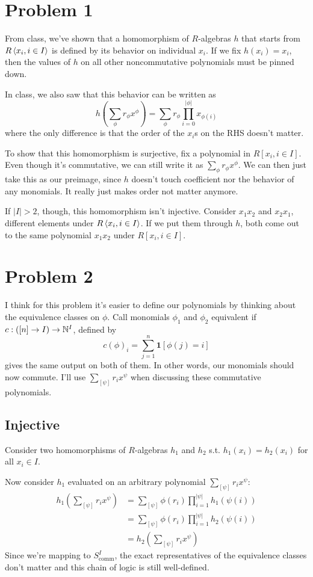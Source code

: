 \documentclass[12pt]{article}
\begin{document}
\section{Problem 1}

From class, we've shown that a homomorphism of $R$-algebras $h$
that starts from $R\braket{x_i, i \in I}$ is defined by its behavior on individual $x_i$.
If we fix $h(x_i)=x_i$, then the values of $h$ on all
other noncommutative polynomials must be pinned down.

In class, we also saw that this behavior can be written as
\[h\left(\sum_{\phi} r_\phi x^\phi\right)=\sum_{\phi} r_\phi \prod_{i=0}^{|\phi|} x_{\phi(i)}\]
where the only difference is that the order of the $x_i$s on the RHS doesn't matter.

To show that this homomorphism is surjective, fix a polynomial in $R[x_i, i \in I]$.
Even though it's commutative, we can still write it as $\sum_{\phi} r_\phi x^\phi$.
We can then just take this as our preimage, since $h$ doesn't touch coefficient
nor the behavior of any monomials.
It really just makes order not matter anymore.

If $|I| > 2$, though, this homomorphism isn't injective.
Consider $x_1x_2$ and $x_2x_1$, different elements under $R\braket{x_i, i \in I}$.
If we put them through $h$, both come out to the same polynomial $x_1x_2$ under
$R[x_i, i \in I]$.

\pagebreak

\section{Problem 2}

I think for this problem it's easier to define our polynomials by thinking
about the equivalence classes on $\phi$.
Call monomials $\phi_1$ and $\phi_2$ equivalent if $c: ([n] \to I) \to \mathbb{N}^I$, defined by
\[c(\phi)_i=\sum_{j=1}^{n} \mathbf{1}[\phi(j)=i]\]
gives the same output on both of them.
In other words, our monomials should now commute.
I'll use $\sum_{[\psi]} r_i x^\psi$ when discussing these commutative polynomials.

\subsection{Injective}

Consider two homomorphisms of $R$-algebras $h_1$ and $h_2$ s.t. $h_1(x_i)=h_2(x_i)$ for all $x_i \in I$.

Now consider $h_1$ evaluated on an arbitrary polynomial $\sum_{[\psi]} r_i x^\psi$:
\begin{align*}
  h_1\left(\sum_{[\psi]} r_i x^\psi\right)
   & = \sum_{[\psi]} \phi(r_i) \prod_{i=1}^{|\psi|} h_1(\psi(i)) \\
   & = \sum_{[\psi]} \phi(r_i) \prod_{i=1}^{|\psi|} h_2(\psi(i)) \\
   & = h_2\left(\sum_{[\psi]} r_i x^\psi\right)
\end{align*}
Since we're mapping to $S^I_{\text{comm}}$, the exact representatives
of the equivalence classes don't matter and this chain of logic is still well-defined.
\end{document}
